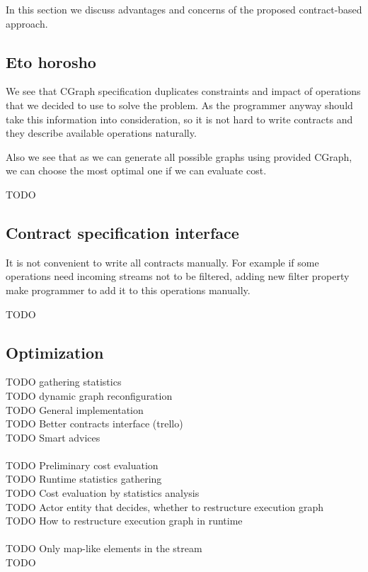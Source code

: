 In this section we discuss advantages and concerns of the proposed contract-based approach.

\subsection{Eto horosho}

We see that CGraph specification duplicates constraints and impact of operations that we decided to use to solve the problem.
As the programmer anyway should take this information into consideration, so it is not hard to write contracts and they describe available operations naturally.

Also we see that as we can generate all possible graphs using provided CGraph, we can choose the most optimal one if we can evaluate cost.

TODO

\subsection{Contract specification interface}

It is not convenient to write all contracts manually.
For example if some operations need incoming streams not to be filtered, adding new filter property make programmer to add it to this operations manually.


TODO

\subsection{Optimization}

TODO gathering statistics \\
TODO dynamic graph reconfiguration \\

TODO General implementation \\
TODO Better contracts interface (trello) \\
TODO Smart advices \\
 \\
TODO Preliminary cost evaluation \\
TODO Runtime statistics gathering \\
TODO Cost evaluation by statistics analysis \\
TODO Actor entity that decides, whether to restructure execution graph \\
TODO How to restructure execution graph in runtime \\
 \\
TODO Only map-like elements in the stream \\
TODO
